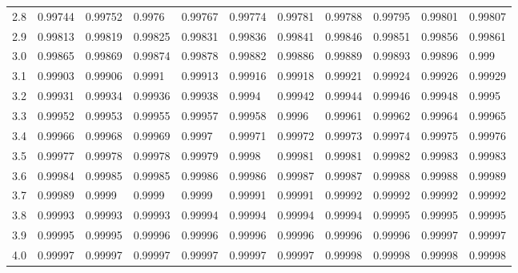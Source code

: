 \documentclass[%
11pt,%
twoside,%
titlepage,%
german,%
headsepline%
]{scrartcl}
\newcommand{\spaltenheight}{\rule{0mm}{3ex}}
\begin{document}
\begin{table}[]
{\begin{tabular}{l|llllllllll}
\rowcolor{lightyellow}\spaltenheight 2.8 & 0.99744 & 0.99752 & 0.9976  & 0.99767 & 0.99774 & 0.99781 & 0.99788 & 0.99795 & 0.99801 & 0.99807 \\
\rowcolor{Gray}\spaltenheight 2.9 & 0.99813 & 0.99819 & 0.99825 & 0.99831 & 0.99836 & 0.99841 & 0.99846 & 0.99851 & 0.99856 & 0.99861 \\
\rowcolor{lightyellow}\spaltenheight 3.0   & 0.99865 & 0.99869 & 0.99874 & 0.99878 & 0.99882 & 0.99886 & 0.99889 & 0.99893 & 0.99896 & 0.999   \\
\rowcolor{Gray}\spaltenheight 3.1 & 0.99903 & 0.99906 & 0.9991  & 0.99913 & 0.99916 & 0.99918 & 0.99921 & 0.99924 & 0.99926 & 0.99929 \\
\rowcolor{lightyellow}\spaltenheight 3.2 & 0.99931 & 0.99934 & 0.99936 & 0.99938 & 0.9994  & 0.99942 & 0.99944 & 0.99946 & 0.99948 & 0.9995  \\
\rowcolor{Gray}\spaltenheight 3.3 & 0.99952 & 0.99953 & 0.99955 & 0.99957 & 0.99958 & 0.9996  & 0.99961 & 0.99962 & 0.99964 & 0.99965 \\
\rowcolor{lightyellow}\spaltenheight 3.4 & 0.99966 & 0.99968 & 0.99969 & 0.9997  & 0.99971 & 0.99972 & 0.99973 & 0.99974 & 0.99975 & 0.99976 \\
\rowcolor{Gray}\spaltenheight 3.5 & 0.99977 & 0.99978 & 0.99978 & 0.99979 & 0.9998  & 0.99981 & 0.99981 & 0.99982 & 0.99983 & 0.99983 \\
\rowcolor{lightyellow}\spaltenheight 3.6 & 0.99984 & 0.99985 & 0.99985 & 0.99986 & 0.99986 & 0.99987 & 0.99987 & 0.99988 & 0.99988 & 0.99989 \\
\rowcolor{Gray}\spaltenheight 3.7 & 0.99989 & 0.9999  & 0.9999  & 0.9999  & 0.99991 & 0.99991 & 0.99992 & 0.99992 & 0.99992 & 0.99992 \\
\rowcolor{lightyellow}\spaltenheight 3.8 & 0.99993 & 0.99993 & 0.99993 & 0.99994 & 0.99994 & 0.99994 & 0.99994 & 0.99995 & 0.99995 & 0.99995 \\
\rowcolor{Gray}\spaltenheight 3.9 & 0.99995 & 0.99995 & 0.99996 & 0.99996 & 0.99996 & 0.99996 & 0.99996 & 0.99996 & 0.99997 & 0.99997 \\
\rowcolor{lightyellow}\spaltenheight 4.0   & 0.99997 & 0.99997 & 0.99997 & 0.99997 & 0.99997 & 0.99997 & 0.99998 & 0.99998 & 0.99998 & 0.99998
\end{tabular}
}
\end{table}


\cleardoublepage
\listoffigures
\listoftables
%
%
\end{document}
